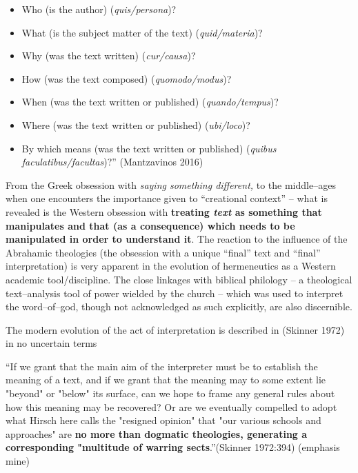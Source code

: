 \begin{itemize}
\itemsep=0pt
\item Who (is the author) (\textit{quis/persona})?

 \item What (is the subject matter of the text) (\textit{quid/materia})?

 \item Why (was the text written) (\textit{cur/causa})?

 \item How (was the text composed) (\textit{quomodo/modus})?

 \item When (was the text written or published) (\textit{quando/tempus})?

 \item Where (was the text written or published) (\textit{ubi/loco})?

 \item By which means (was the text written or published) (\textit{quibus faculatibus/facultas})?” (Mantzavinos 2016)

\end{itemize}

From the Greek obsession with \textit{saying something different,} to the middle–ages when one encounters the importance given to “creational context” – what is revealed is the Western obsession with \textbf{treating \textit{text} as something that manipulates and that (as a consequence) which needs to be manipulated in order to understand it}. The reaction to the influence of the Abrahamic theologies (the obsession with a unique “final” text and “final” interpretation) is very apparent in the evolution of hermeneutics as a Western academic tool/discipline. The close linkages with biblical philology – a theological text–analysis tool of power wielded by the church – which was used to interpret the word–of–god, though not acknowledged as such explicitly, are also discernible.

The modern evolution of the act of interpretation is described in (Skinner 1972) in no uncertain terms

\begin{myquote}
“If we grant that the main aim of the interpreter must be to establish the meaning of a text, and if we grant that the meaning may to some extent lie "beyond" or "below" its surface, can we hope to frame any general rules about how this meaning may be recovered? Or are we eventually compelled to adopt what Hirsch here calls the "resigned opinion" that "our various schools and approaches" are \textbf{no more than dogmatic theologies, generating a corresponding "multitude of warring sects}.”\hfill (Skinner 1972:394) (emphasis mine)
\end{myquote}

